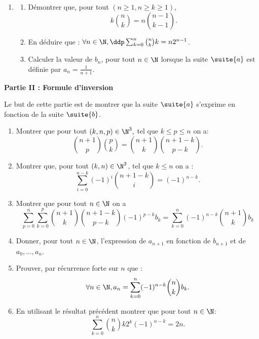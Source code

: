 \begin{exercice}
\begin{enumerate}
\item 
\begin{enumerate}
\item Démontrer que, pour tout $(n\geq 1,n\geq k\geq 1)$, $$k\binom{n}{k}=n \binom{n-1}{k-1}.$$
\item En déduire que : $\forall n \in \N, \ddp \sum_{k=0}^n \binom{n}{k} k = n2^{n-1}$.
\item Calculer la valeur de $b_n$, pour tout $n \in \N$ lorsque la suite $\suite{a}$ est définie par $a_n=\frac{1}{n+1}$. 
\end{enumerate}
\end{enumerate}
\begin{center}
\textbf{Partie II : Formule d'inversion }
\end{center}
Le  but de cette partie est de montrer que la suite $\suite{a}$ s'exprime en fonction de la suite $\suite{b}$. 
\begin{enumerate}
\item Montrer que pour tout $(k, n , p ) \in \N^3,$ tel que $k\leq p \leq n$ on  a:
$$\binom{n+1}{p}\binom{p}{k}=\binom{n+1}{k}\binom{n+1-k}{p-k}.$$
\item Montrer que, pour tout $(k,n) \in \N^2$, tel que $k\leq n$ on  a :
$$\sum_{i=0}^{n-k} (-1)^i  \binom{n+1-k}{i}=(-1)^{n-k}.$$ 
\item  Montrer que pour tout $n\in \N$ on a $$\sum_{p=0}^{n}\sum_{k=0}^p  \binom{n+1}{k}\binom{n+1-k}{p-k} (-1)^{p-k}  b_k	 = \sum_{k=0}^{n} (-1)^{n-k}  \binom{n+1}{k} b_k $$
\item Donner, pour tout $n\in \N$, l'expression de $a_{n+1}$ en fonction de $b_{n+1}$ et de $a_0, ..., a_n$. 
\item Prouver, par récurrence forte sur $n$ que :
$$\forall n \in \N, a_n =\sum_{k=0}^n (-1)^{n-k} \binom{n}{k} b_k.$$
\item En utilisant le résultat précédent montrer que pour tout $n\in \N$:
$$\sum_{k=0}^{n}   \binom{n}{k}k2^k(-1)^{n-k}=2n.$$ 
\end{enumerate}




\end{exercice}

